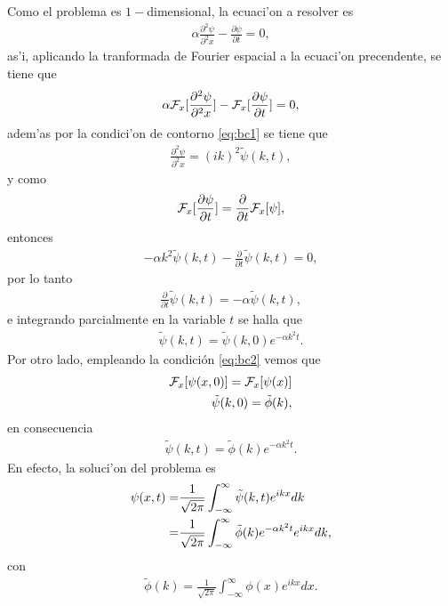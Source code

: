 Como el problema es $1-$dimensional, la ecuaci'on a resolver es
\begin{align}
\alpha \frac{\partial^2 \psi}{\partial^2 x}-\frac{\partial \psi}{\partial t}=0,
\end{align}
as'i, aplicando la tranformada de Fourier espacial a la ecuaci'on precendente, se tiene que
\begin{align}
\alpha {\cal F}_{x}[\frac{\partial^2 \psi}{\partial^2 x}]-{\cal F}_{x}[\frac{\partial \psi}{\partial t}]=0,
\end{align}
adem'as por la condici'on de contorno \eqref{eq:bc1} se tiene que
\begin{align}
\frac{\partial^2 \psi}{\partial^2 x}=(i k)^2 \tilde{\psi}(k,t),
\end{align}
y como
\begin{align}
{\cal F}_{x}[\frac{\partial \psi}{\partial t}]=\frac{\partial}{\partial t}{\cal F}_{x}[\psi],
\end{align}
entonces
\begin{align}
-\alpha k^2 \tilde{\psi}(k,t)-\frac{\partial}{\partial t}\tilde{\psi}(k,t)=0,
\end{align}
por lo tanto
\begin{align}
\frac{\partial}{\partial t}\tilde{\psi}(k,t)=-\alpha \tilde{\psi}(k,t),
\end{align}
e integrando parcialmente en la variable $t$ se halla que
\begin{align}
\tilde{\psi}(k,t)=\tilde{\psi}(k,0)e^{-\alpha k^2 t}.
\end{align}
Por otro lado, empleando la condición \eqref{eq:bc2} vemos que
\begin{align}
{\cal F}_{x}[\psi(x,0)]={\cal F}_{x}[\psi(x)]\notag \\
\tilde{\psi}(k,0)=\tilde{\phi}(k),
\end{align}
en consecuencia
\begin{align}
\tilde{\psi}(k,t)=\tilde{\phi}(k)e^{-\alpha k^2 t}.
\end{align}
En efecto, la soluci'on del problema es
\begin{align}
\psi(x,t)=&\frac{1}{\sqrt{2\pi}}\int_{-\infty}^{\infty}\tilde{\psi}(k,t)e^{ikx} dk\notag \\
=&\frac{1}{\sqrt{2\pi}}\int_{-\infty}^{\infty}\tilde{\phi}(k)e^{-\alpha k^2 t}e^{ikx} dk,
\end{align}
con
\begin{align}
\tilde{\phi}(k)=\frac{1}{\sqrt{2\pi}}\int_{-\infty}^{\infty}\phi(x)e^{ikx}dx.
\end{align}
